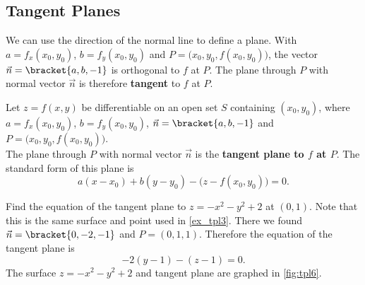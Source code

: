 \subsection{Tangent Planes}

We can use the direction of the normal line to define a plane. With $a=f_x(x_0,y_0)$, $b=f_y(x_0,y_0)$ and $P = \bigl(x_0,y_0,f(x_0,y_0)\bigr)$, the vector $\vec n=\bracket{a,b,-1}$ is orthogonal to $f$ at $P$. The plane through $P$ with normal vector $\vec n$ is therefore \textbf{tangent} to $f$ at $P$.

\begin{definition}\label{def:tangent_plane}
Let $z=f(x,y)$ be differentiable on an open set $S$ containing $(x_0,y_0)$, where
$a = f_x(x_0,y_0)$, $b=f_y(x_0,y_0)$, $\vec n=\bracket{a,b,-1}$ and $P=\bigl(x_0,y_0,f(x_0,y_0)\bigr)$.\\

The plane through $P$ with normal vector $\vec n$ is the \textbf{tangent plane to $f$ at $P$}. The standard form of this plane is 
\[a(x-x_0) + b(y-y_0) - \bigl(z-f(x_0,y_0)\bigr) = 0.\]
\end{definition}

\begin{example}\label{ex_tpl6}
Find the equation of the tangent plane to $z=-x^2-y^2+2$ at $(0,1)$.
\solution
Note that this is the same surface and point used in \autoref{ex_tpl3}.
%
%
There we found $\vec n =\bracket{0,-2,-1}$ and $P = (0,1,1)$. Therefore the equation of the tangent plane is
\[-2(y-1)-(z-1)=0.\]
The surface $z=-x^2-y^2+2$ and tangent plane are graphed in \autoref{fig:tpl6}.
\end{example}


